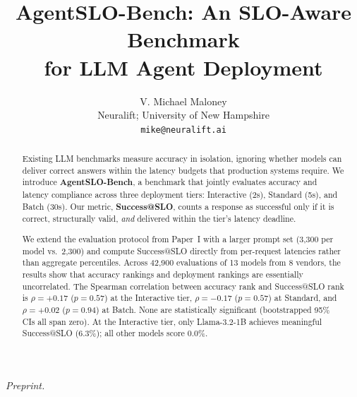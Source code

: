 \documentclass[11pt]{article}
\title{AgentSLO-Bench: An SLO-Aware Benchmark\\for LLM Agent Deployment}
\author{
V. Michael Maloney \\
Neuralift; University of New Hampshire \\
\texttt{mike@neuralift.ai}
}
\date{}
\begin{document}
\maketitle
\begin{center}
\textit{Preprint.}
\end{center}

\begin{abstract}
Existing LLM benchmarks measure accuracy in isolation, ignoring whether models can deliver correct answers within the latency budgets that production systems require.  We introduce \textbf{AgentSLO-Bench}, a benchmark that jointly evaluates accuracy and latency compliance across three deployment tiers: Interactive (2s), Standard (5s), and Batch (30s).  Our metric, \textbf{Success@SLO}, counts a response as successful only if it is correct, structurally valid, \emph{and} delivered within the tier's latency deadline.

We extend the evaluation protocol from Paper~I with a larger prompt set (3{,}300 per model vs.\ 2{,}300) and compute Success@SLO directly from per-request latencies rather than aggregate percentiles.  Across 42{,}900 evaluations of 13 models from 8 vendors, the results show that accuracy rankings and deployment rankings are essentially uncorrelated.  The Spearman correlation between accuracy rank and Success@SLO rank is $\rho = +0.17$ ($p = 0.57$) at the Interactive tier, $\rho = -0.17$ ($p = 0.57$) at Standard, and $\rho = +0.02$ ($p = 0.94$) at Batch.  None are statistically significant (bootstrapped 95\% CIs all span zero).  At the Interactive tier, only Llama-3.2-1B achieves meaningful Success@SLO (6.3\%); all other models score 0.0\%.


\end{abstract}
\end{document}
